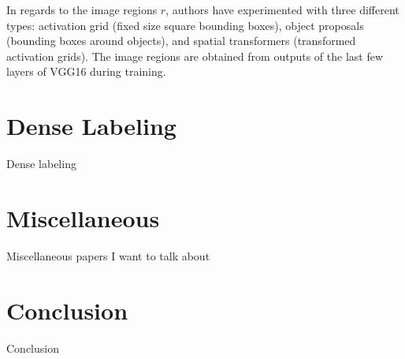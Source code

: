 \documentclass[10pt,twocolumn,letterpaper]{article}
\begin{document}
In regards to the image regions $r$, authors have experimented with three
different types: activation grid (fixed size square bounding boxes), object
proposals (bounding boxes around objects), and spatial transformers
(transformed activation grids). The image regions are obtained from outputs of
the last few layers of VGG16 during training.

\section{Dense Labeling}

Dense labeling

\section{Miscellaneous}

Miscellaneous papers I want to talk about

\section{Conclusion}

Conclusion

{\small


}
\end{document}
